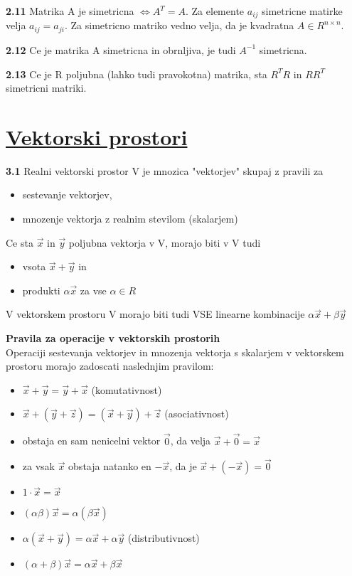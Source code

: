 \documentclass{article}
\begin{document}
\begin{multicols}{3}
\textbf{2.11} Matrika A je simetricna $\Leftrightarrow A^{T} = A$. Za elemente
$a_{ij}$ simetricne matirke velja $a_{ij} = a_{ji}$. Za simetricno matriko vedno velja,
da je kvadratna $A \in R^{n \times n}$.

\textbf{2.12} Ce je matrika A simetricna in obrnljiva, je tudi $A^{-1}$ simetricna.

\textbf{2.13} Ce je R poljubna (lahko tudi pravokotna) matrika, sta $R^{T}R$ in
$RR^{T}$ simetricni matriki.

\section{\underline{Vektorski prostori}}

\textbf{3.1} Realni vektorski prostor V je mnozica "vektorjev" skupaj z pravili za
\begin{itemize}
    \item sestevanje vektorjev,
    \item mnozenje vektorja z realnim stevilom (skalarjem)
\end{itemize}
Ce sta $\vec{x}$ in $\vec{y}$ poljubna vektorja v V, morajo biti v V tudi
\begin{itemize}
    \item vsota $\vec{x} + \vec{y}$ in 
    \item produkti $\alpha\vec{x}$ za vse $\alpha \in R$
\end{itemize}
V vektorskem prostoru V morajo biti tudi VSE linearne kombinacije
$\alpha\vec{x} + \beta\vec{y}$

\textbf{Pravila za operacije v vektorskih prostorih}\\
Operaciji sestevanja vektorjev in mnozenja vektorja s skalarjem v vektorskem prostoru
morajo zadoscati naslednjim pravilom:
\begin{itemize}
    \item $\vec{x} + \vec{y} = \vec{y} + \vec{x}$ (komutativnost)
    \item $\vec{x} + (\vec{y} + \vec{z}) = (\vec{x} + \vec{y}) + \vec{z}$ (asociativnost)
    \item obstaja en sam nenicelni vektor $\vec{0}$, da velja $\vec{x} + \vec{0} = \vec{x}$
    \item za vsak $\vec{x}$ obstaja natanko en $-\vec{x}$, da je $\vec{x} + (-\vec{x}) = \vec{0}$
    \item $1 \cdot \vec{x} = \vec{x}$
    \item $(\alpha\beta)\vec{x} = \alpha(\beta\vec{x})$
    \item $\alpha(\vec{x} + \vec{y}) = \alpha\vec{x} + \alpha\vec{y}$ (distributivnost)
    \item $(\alpha + \beta)\vec{x} = \alpha\vec{x} + \beta\vec{x}$
\end{itemize}


\end{multicols}
\end{document}
